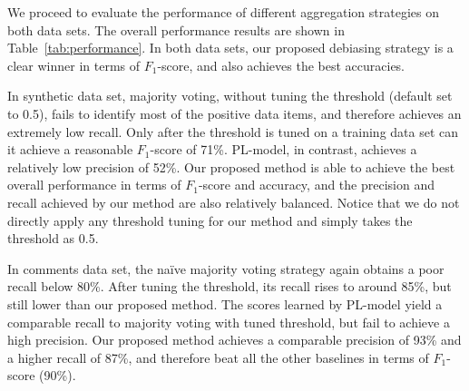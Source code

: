 We proceed to evaluate the performance of different aggregation strategies on both data sets.  
The overall performance results are shown in Table~\ref{tab:performance}.  
In both data sets, our proposed debiasing strategy is a clear winner in terms of $F_1$-score, 
and also achieves the best accuracies.  

In synthetic data set, majority voting, without tuning the threshold (default set to 0.5), fails to identify most of the positive data items, 
and therefore achieves an extremely low recall.  
Only after the threshold is tuned on a training data set 
can it achieve a reasonable $F_1$-score of 71\%.  
PL-model, in contrast, achieves a relatively low precision of 52\%.  
Our proposed method is able to achieve the best overall performance in terms of $F_1$-score and accuracy, 
and the precision and recall achieved by our method are also relatively balanced.  
Notice that we do not directly apply any threshold tuning for our method and simply takes the threshold as 0.5.  

In comments data set, the na\"{i}ve majority voting strategy again obtains a poor recall below 80\%.
After tuning the threshold, its recall rises to around 85\%, but still lower than our proposed method.  
The scores learned by PL-model yield a comparable recall to majority voting with tuned threshold, 
but fail to achieve a high precision.  
Our proposed method achieves a comparable precision of 93\% and a higher recall of 87\%, 
and therefore beat all the other baselines in terms of $F_1$-score (90\%).  




